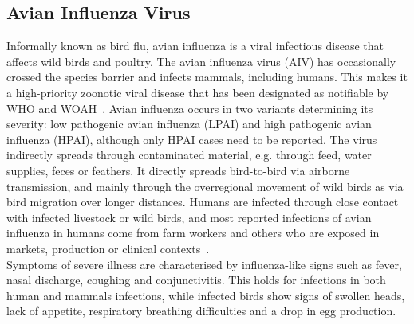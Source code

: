 \subsection{Avian Influenza Virus}
Informally known as bird flu, avian influenza is a viral infectious disease that affects wild birds and poultry. The avian influenza virus (AIV) has occasionally crossed the species barrier and infects mammals, including humans. This makes it a high-priority zoonotic viral disease that has been designated as notifiable by WHO and WOAH~\cite{woah2023list}. Avian influenza occurs in two variants determining its severity: low pathogenic avian influenza (LPAI) and high pathogenic avian influenza (HPAI), although only HPAI cases need to be reported. The virus indirectly spreads through contaminated material, e.g. through feed, water supplies, feces or feathers. It directly spreads bird-to-bird via airborne transmission, and mainly through the overregional movement of wild birds as via bird migration over longer distances. Humans are infected through close contact with infected livestock or wild birds, and most reported infections of avian influenza in humans come from farm workers and others who are exposed in markets, production or clinical contexts~\cite{webster1992evolution}. \\
Symptoms of severe illness are characterised by influenza-like signs such as fever, nasal discharge, coughing and conjunctivitis. This holds for infections in both human and mammals infections, while infected birds show signs of swollen heads, lack of appetite, respiratory breathing difficulties and a drop in egg production.

